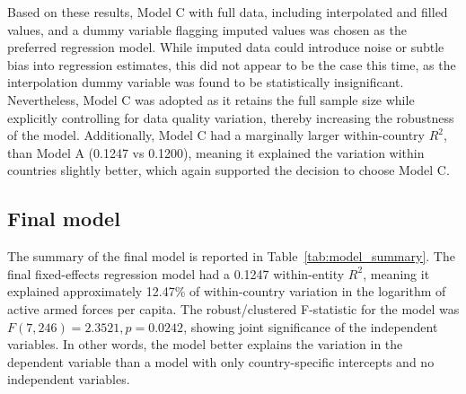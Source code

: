 Based on these results, Model C with full data, including interpolated and filled values, and a dummy 
variable flagging imputed values was chosen
as the preferred regression model. While imputed data could introduce noise or subtle bias
into regression estimates, this did not appear to be the case this time, as the interpolation dummy 
variable was found to be statistically insignificant. 
Nevertheless, Model C was adopted as it retains the full sample size while explicitly controlling 
for data quality variation, thereby increasing the robustness of the model.
Additionally, Model C had a marginally larger within-country 
$R^2$, than Model A (0.1247 vs 0.1200), meaning it explained the variation within countries 
slightly better, which again supported the decision to choose Model C.

\subsection{Final model}

The summary of the final model is reported in Table~\ref{tab:model_summary}.
The final fixed-effects regression model had a 0.1247 within-entity $R^2$, meaning it explained 
approximately 12.47\% of within-country variation in the logarithm of active armed forces per capita.
The robust/clustered F-statistic for the model was $F(7, 246)=2.3521, p=0.0242$, 
showing joint significance of the independent variables.
In other words, the model better explains the variation in the dependent variable than a model with 
only country-specific intercepts and no independent variables. 

\renewcommand{\arraystretch}{1.3}


